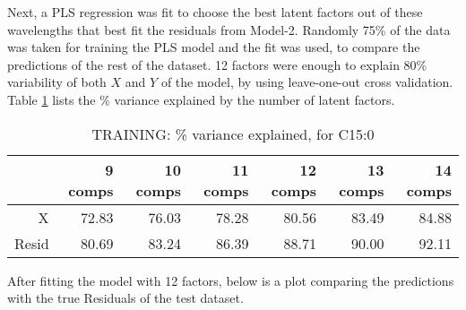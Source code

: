 Next, a PLS regression was fit to choose the best latent factors out of these wavelengths that best fit the residuals from Model-2. Randomly 75\% of the data was taken for training the PLS model and the fit was used, to compare the predictions of the rest of the dataset. 12 factors were enough to explain 80\% variability of both $X$ and $Y$ of the model, by using leave-one-out cross validation. Table \ref{Tab:plsr15} lists the \% variance explained by the number of latent factors.
\begin{table}[H]
\centering
\begin{tabular}{rrrrrrr}
  \hline
      & 9 comps & 10 comps & 11 comps & 12 comps & 13 comps & 14 comps \\
  \hline
  X   & 72.83   &  76.03   &  78.28   & 80.56    & 83.49    & 84.88 \\
Resid & 80.69   &  83.24   &  86.39   & 88.71    & 90.00    & 92.11 \\
  \hline
\end{tabular}
\caption{TRAINING: \% variance explained, for C15:0}
\label{Tab:plsr15}
\end{table}

After fitting the model with 12 factors, below is a plot comparing the predictions with the true Residuals of the test dataset.

